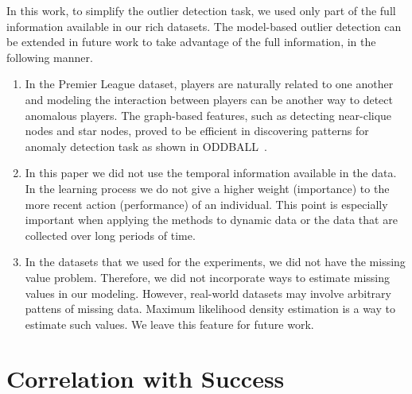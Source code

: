 {\begin{enumerate}
	In this work, to simplify the outlier detection task, we used only part of the full information available in our rich datasets. The model-based outlier detection can be extended in future work to take advantage of the full information, in the following manner. 
	\begin{enumerate}
		\item In the Premier League dataset, players are naturally related to one another and modeling the interaction between players can be another way to detect anomalous players.
		The graph-based features, such as detecting near-clique nodes and star nodes, proved to be efficient in discovering patterns for anomaly detection task as shown in ODDBALL~\citep{Akoglu2010}.
		\item In this paper we did not use the temporal information available in the data. In the learning process we do not give a higher weight (importance) to the more recent action (performance) of an individual. This point is especially important when applying the methods to dynamic data or the data that are collected over long periods of time. 
		\item In the datasets that we used for the experiments, we did not have the missing value problem. Therefore, we did not incorporate ways to estimate missing values in our modeling. However, real-world datasets may involve arbitrary pattens of missing data. Maximum likelihood density estimation is a way to estimate such values. We leave this feature for future work.
	\end{enumerate}
		\end{enumerate}

\section{Correlation with Success}
\label{sec:success}


}
